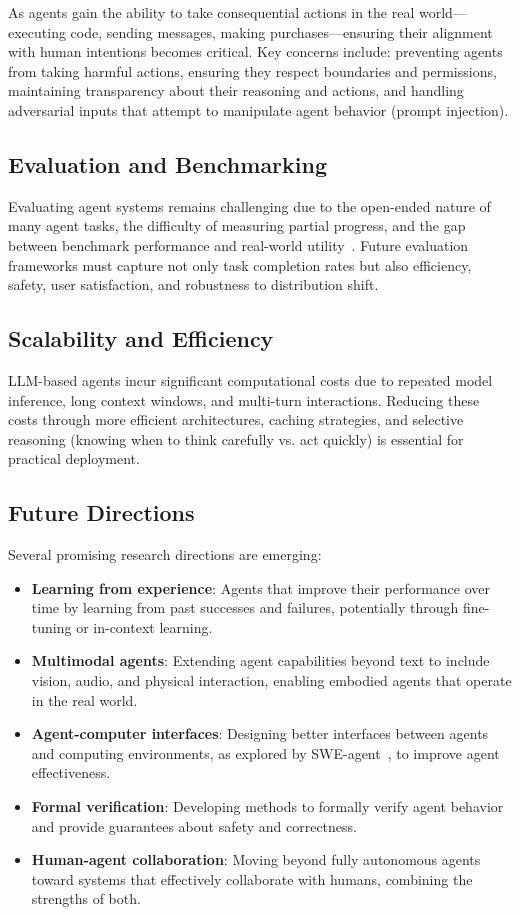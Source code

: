 \documentclass[11pt,a4paper]{article}
\begin{document}
As agents gain the ability to take consequential actions in the real world---executing code, sending messages, making purchases---ensuring their alignment with human intentions becomes critical. Key concerns include: preventing agents from taking harmful actions, ensuring they respect boundaries and permissions, maintaining transparency about their reasoning and actions, and handling adversarial inputs that attempt to manipulate agent behavior (prompt injection).

\subsection{Evaluation and Benchmarking}

Evaluating agent systems remains challenging due to the open-ended nature of many agent tasks, the difficulty of measuring partial progress, and the gap between benchmark performance and real-world utility~\citep{liu2023agentbench, liu2024agentboard}. Future evaluation frameworks must capture not only task completion rates but also efficiency, safety, user satisfaction, and robustness to distribution shift.

\subsection{Scalability and Efficiency}

LLM-based agents incur significant computational costs due to repeated model inference, long context windows, and multi-turn interactions. Reducing these costs through more efficient architectures, caching strategies, and selective reasoning (knowing when to think carefully vs. act quickly) is essential for practical deployment.

\subsection{Future Directions}

Several promising research directions are emerging:

\begin{itemize}
    \item \textbf{Learning from experience}: Agents that improve their performance over time by learning from past successes and failures, potentially through fine-tuning or in-context learning.
    \item \textbf{Multimodal agents}: Extending agent capabilities beyond text to include vision, audio, and physical interaction, enabling embodied agents that operate in the real world.
    \item \textbf{Agent-computer interfaces}: Designing better interfaces between agents and computing environments, as explored by SWE-agent~\citep{yang2024swe}, to improve agent effectiveness.
    \item \textbf{Formal verification}: Developing methods to formally verify agent behavior and provide guarantees about safety and correctness.
    \item \textbf{Human-agent collaboration}: Moving beyond fully autonomous agents toward systems that effectively collaborate with humans, combining the strengths of both.
\end{itemize}
\end{document}
